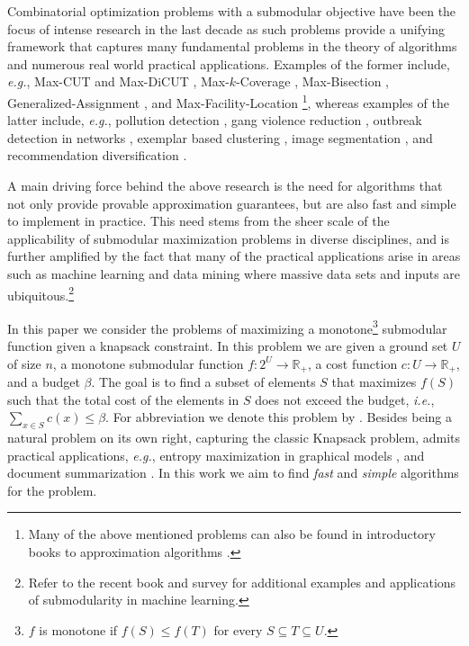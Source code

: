 \documentclass[a4paper,UKenglish,cleveref, autoref]{lipics-v2019}
\begin{document}
Combinatorial optimization problems with a submodular objective have been the focus of intense research in the last decade as such problems provide a unifying framework that captures many fundamental problems in the theory of algorithms and numerous real world practical applications.
Examples of the former include, {\em e.g.}, Max-CUT and Max-DiCUT \cite{FG95,GW95,HZ01,H01,K72,KKMO07,LLZ02,TSSW00}, Max-$k$-Coverage \cite{F98,SW11,V01}, Max-Bisection \cite{ABG13,FJ97,HZ02,Y01}, Generalized-Assignment \cite{CK05,CKR06,FGMS06,FV06}, and Max-Facility-Location \cite{AS99,CFN77a,CFN77b}\footnote{Many of the above mentioned problems can also be found in introductory books to approximation algorithms \cite{SW11,V01}.}, whereas examples of the latter include, {\em e.g.}, pollution detection \cite{KLGVF08}, gang violence reduction \cite{SSPB14}, outbreak detection in networks \cite{LKGFFVG07}, exemplar based clustering \cite{GK10}, image segmentation \cite{KXFK11}, and recommendation diversification \cite{YG11}.

A main driving force behind the above research is the need for algorithms that not only provide provable approximation guarantees, but are also fast and  simple to implement in practice.
This need stems from the sheer scale of the applicability of submodular maximization problems in diverse disciplines, and is further amplified by the fact that many of the practical applications arise in areas such as machine learning and data mining where massive data sets and inputs are ubiquitous.\footnote{Refer to the recent book \cite{B13} and survey \cite{KG14} for additional examples and applications of submodularity in machine learning.}



In this paper we consider the problems of maximizing a monotone\footnote{
    $f$ is monotone if $f(S) \leq f(T)$ for every $S \subseteq T \subseteq U$.
} submodular function given a knapsack constraint.
In this problem we are given a ground set
$U$ of size $n$, a monotone submodular function $f:2^U \to \mathbb{R}_+$, a cost function $c:U \to \mathbb{R}_+$, and a budget $\beta$.
The goal is to find a subset of elements $S$ that maximizes $f(S)$ such that the total cost of the elements in $S$ does not exceed the budget, {\em i.e.}, $\sum _{x\in S}c(x)\leq \beta$.
For abbreviation we denote this problem by \SK.
Besides being a natural problem on its own right, capturing the classic Knapsack problem, \SK admits practical applications, {\em e.g.}, entropy maximization in graphical models \cite{krause2005note}, and document summarization \cite{LB10}.
In this work we aim to find {\em fast} and {\em simple} algorithms for the \SK problem.
\end{document}
